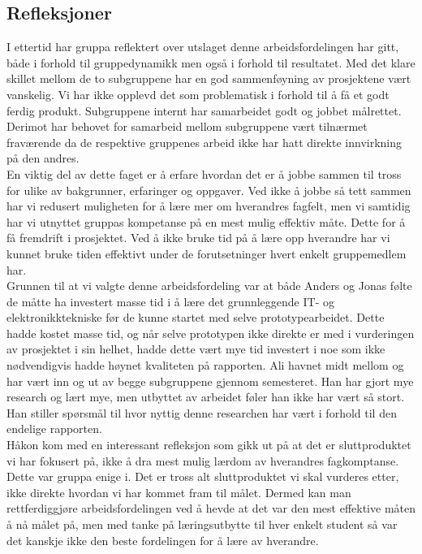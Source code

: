 \subsection{Refleksjoner}


I ettertid har gruppa reflektert over utslaget denne arbeidsfordelingen har gitt, både i forhold til gruppedynamikk men også i forhold til resultatet. Med det klare skillet mellom de to subgruppene har en god sammenføyning av prosjektene vært vanskelig. Vi har ikke opplevd det som problematisk i forhold til å få et godt ferdig produkt. Subgruppene internt har samarbeidet godt og jobbet målrettet. Derimot har behovet for samarbeid mellom subgruppene vært tilnærmet fraværende da de respektive gruppenes arbeid ikke har hatt direkte innvirkning på den andres.\\ 

En viktig del av dette faget er å erfare hvordan det er å jobbe sammen til tross for ulike av bakgrunner, erfaringer og oppgaver. Ved ikke å jobbe så tett sammen har vi redusert muligheten for å lære mer om hverandres fagfelt, men vi samtidig har vi utnyttet gruppas kompetanse på en mest mulig effektiv måte. Dette for å få fremdrift i prosjektet. Ved å ikke bruke tid på å lære opp hverandre har vi kunnet bruke tiden effektivt under de forutsetninger hvert enkelt gruppemedlem har.\\

Grunnen til at vi valgte denne arbeidsfordeling var at både Anders og Jonas følte de måtte ha investert masse tid i å lære det grunnleggende IT- og elektronikktekniske før de kunne startet med selve prototypearbeidet. Dette hadde kostet masse tid, og når selve prototypen ikke direkte er med i vurderingen av prosjektet i sin helhet, hadde dette vært mye tid investert i noe som ikke nødvendigvis hadde høynet kvaliteten på rapporten. Ali havnet midt mellom og har vært inn og ut av begge subgruppene gjennom semesteret. Han har gjort mye research og lært mye, men utbyttet av arbeidet føler han ikke har vært så stort. Han stiller spørsmål til hvor nyttig denne researchen har vært i forhold til den endelige rapporten.\\

Håkon kom med en interessant refleksjon som gikk ut på at det er sluttproduktet vi har fokusert på, ikke å dra mest mulig lærdom av hverandres fagkomptanse. Dette var gruppa enige i. Det er tross alt sluttproduktet vi skal vurderes etter, ikke direkte hvordan vi har kommet fram til målet. Dermed kan man rettferdiggjøre arbeidsfordelingen ved å hevde at det var den mest effektive måten å nå målet på, men med tanke på læringsutbytte til hver enkelt student så var det kanskje ikke den beste fordelingen for å lære av hverandre. \\

